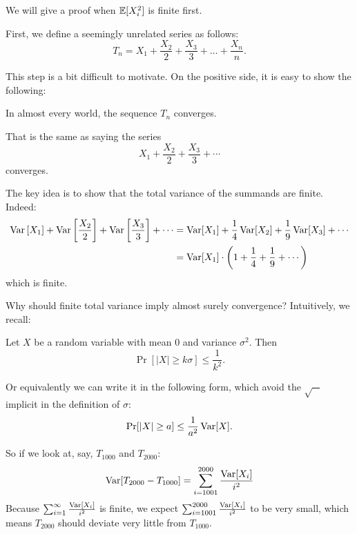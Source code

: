 We will give a proof when $\mathbb E[X_i^2]$ is finite first.

First, we define a seemingly unrelated series as follows:
\[ T_n = X_1+\frac{X_2}{2}+\frac{X_3}{3}+\dots+\frac{X_n}{n}. \]

This step is a bit difficult to motivate.
On the positive side, it is easy to show the following:
\begin{claim}
	In almost every world, the sequence $T_n$ converges.
\end{claim}
That is the same as saying the series
\[ X_1+\frac{X_2}{2}+\frac{X_3}{3}+\cdots \]
converges.

The key idea is to show that the total variance of the summands are finite.
Indeed:
\begin{align*}
	\operatorname{Var}\left[X_1\right] + \operatorname{Var}\left[\frac{X_2}{2}\right] + \operatorname{Var}\left[\frac{X_3}{3}\right] + \cdots
	&= \operatorname{Var}[X_1] + \frac{1}{4} \operatorname{Var}[X_2] + \frac{1}{9} \operatorname{Var}[X_3] + \cdots \\
	&= \operatorname{Var}[X_1] \cdot \left(1 + \frac{1}{4} + \frac{1}{9} + \cdots \right)
\end{align*}
which is finite.

Why should finite total variance imply almost surely convergence?
Intuitively, we recall:
\begin{theorem}
	Let $X$ be a random variable with mean $0$ and variance $\sigma^2$.
	Then
	\[ \Pr[|X| \geq k \sigma] \leq \frac{1}{k^2}. \]
\end{theorem}
Or equivalently we can write it in the following form, which avoid the $\sqrt{-}$ implicit in
the definition of $\sigma$:
\[ \Pr[|X| \geq a] \leq \frac{1}{a^2} \operatorname{Var}[X]. \]

So if we look at, say, $T_{1000}$ and $T_{2000}$:
\[ \operatorname{Var}[T_{2000}-T_{1000}] = \sum_{i=1001}^{2000} \frac{\operatorname{Var}[X_i]}{i^2} \]
Because $\sum_{i=1}^{\infty} \frac{\operatorname{Var}[X_i]}{i^2}$ is finite, we expect
$\sum_{i=1001}^{2000} \frac{\operatorname{Var}[X_i]}{i^2}$ to be very small, which means $T_{2000}$ should deviate
very little from $T_{1000}$.

